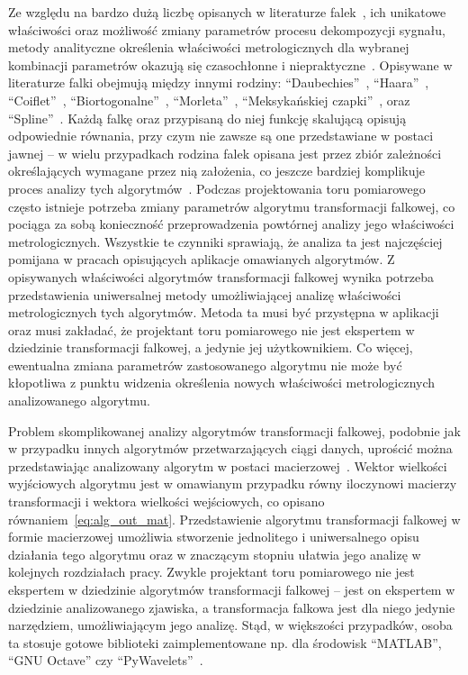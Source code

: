 Ze względu na bardzo dużą liczbę opisanych w literaturze falek~\cite{akujuobi_applications}, ich unikatowe właściwości oraz możliwość zmiany parametrów procesu dekompozycji sygnału, metody analityczne określenia właściwości metrologicznych dla wybranej kombinacji parametrów okazują się czasochłonne i niepraktyczne~\cite{yan_uncertainty, wilczok_uncertainty, peretto_uncertainty, sarrafi_uncertainty}. Opisywane w literaturze falki obejmują między innymi rodziny: \enquote{Daubechies}~\cite{vonesch_dbbasics}, \enquote{Haara}~\cite{stankovic_haar}, \enquote{Coiflet}~\cite{wei_coiflet}, \enquote{Biortogonalne}~\cite{sweldens_bior}, \enquote{Morleta}~\cite{cohen_morlet}, \enquote{Meksykańskiej czapki}~\cite{singh_mexican}, oraz \enquote{Spline}~\cite{averbuch_spline, wang_splinebasics}. Każdą falkę oraz przypisaną do niej funkcję skalującą opisują odpowiednie równania, przy czym nie zawsze są one przedstawiane w postaci jawnej -- w wielu przypadkach rodzina falek opisana jest przez zbiór zależności określających wymagane przez nią założenia, co jeszcze bardziej komplikuje proces analizy tych algorytmów~\cite{rowe_dbmath}. Podczas projektowania toru pomiarowego często istnieje potrzeba zmiany parametrów algorytmu transformacji falkowej, co pociąga za sobą konieczność przeprowadzenia powtórnej analizy jego właściwości metrologicznych. Wszystkie te czynniki sprawiają, że analiza ta jest najczęściej pomijana w pracach opisujących aplikacje omawianych algorytmów. Z opisywanych właściwości algorytmów transformacji falkowej wynika potrzeba przedstawienia uniwersalnej metody umożliwiającej analizę właściwości metrologicznych tych algorytmów. Metoda ta musi być przystępna w aplikacji oraz musi zakładać, że projektant toru pomiarowego nie jest ekspertem w dziedzinie transformacji falkowej, a jedynie jej użytkownikiem. Co więcej, ewentualna zmiana parametrów zastosowanego algorytmu nie może być kłopotliwa z punktu widzenia określenia nowych właściwości metrologicznych analizowanego algorytmu.

Problem skomplikowanej analizy algorytmów transformacji falkowej, podobnie jak w przypadku innych algorytmów przetwarzających ciągi danych, uprościć można przedstawiając analizowany algorytm w postaci macierzowej~\cite{jakubiec_algorithms, jakubiec_system}. Wektor wielkości wyjściowych algorytmu jest w omawianym przypadku równy iloczynowi macierzy transformacji i wektora wielkości wejściowych, co opisano równaniem~\eqref{eq:alg_out_mat}. Przedstawienie algorytmu transformacji falkowej w formie macierzowej umożliwia stworzenie jednolitego i uniwersalnego opisu działania tego algorytmu oraz w znaczącym stopniu ułatwia jego analizę w kolejnych rozdziałach pracy. Zwykle projektant toru pomiarowego nie jest ekspertem w dziedzinie algorytmów transformacji falkowej -- jest on ekspertem w dziedzinie analizowanego zjawiska, a transformacja falkowa jest dla niego jedynie narzędziem, umożliwiającym jego analizę. Stąd, w większości przypadków, osoba ta stosuje gotowe biblioteki zaimplementowane np. dla środowisk \enquote{MATLAB}, \enquote{GNU Octave} czy \enquote{PyWavelets}~\cite{lee_pywavelets, misiti_matlabwav}.

